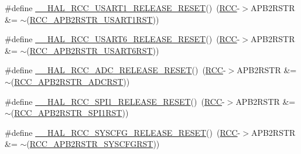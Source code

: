 \begin{DoxyCompactItemize}
\item 
\#define \hyperlink{group___r_c_c___a_p_b2___force___release___reset_ga243061674e38d05d222697046d43813a}{\+\_\+\+\_\+\+H\+A\+L\+\_\+\+R\+C\+C\+\_\+\+U\+S\+A\+R\+T1\+\_\+\+R\+E\+L\+E\+A\+S\+E\+\_\+\+R\+E\+S\+ET}()~(\hyperlink{group___peripheral__declaration_ga74944438a086975793d26ae48d5882d4}{R\+CC}-\/$>$A\+P\+B2\+R\+S\+TR \&= $\sim$(\hyperlink{group___peripheral___registers___bits___definition_gae7ae8e338b3b42ad037e9e5b6eeb2c41}{R\+C\+C\+\_\+\+A\+P\+B2\+R\+S\+T\+R\+\_\+\+U\+S\+A\+R\+T1\+R\+ST}))
\item 
\#define \hyperlink{group___r_c_c___a_p_b2___force___release___reset_ga6b60ae1fd712732bea57de27f79a20d3}{\+\_\+\+\_\+\+H\+A\+L\+\_\+\+R\+C\+C\+\_\+\+U\+S\+A\+R\+T6\+\_\+\+R\+E\+L\+E\+A\+S\+E\+\_\+\+R\+E\+S\+ET}()~(\hyperlink{group___peripheral__declaration_ga74944438a086975793d26ae48d5882d4}{R\+CC}-\/$>$A\+P\+B2\+R\+S\+TR \&= $\sim$(\hyperlink{group___peripheral___registers___bits___definition_gada1df682293e15ed44b081d626220178}{R\+C\+C\+\_\+\+A\+P\+B2\+R\+S\+T\+R\+\_\+\+U\+S\+A\+R\+T6\+R\+ST}))
\item 
\#define \hyperlink{group___r_c_c___a_p_b2___force___release___reset_ga06411259bd987c32186d5851815cbd59}{\+\_\+\+\_\+\+H\+A\+L\+\_\+\+R\+C\+C\+\_\+\+A\+D\+C\+\_\+\+R\+E\+L\+E\+A\+S\+E\+\_\+\+R\+E\+S\+ET}()~(\hyperlink{group___peripheral__declaration_ga74944438a086975793d26ae48d5882d4}{R\+CC}-\/$>$A\+P\+B2\+R\+S\+TR \&= $\sim$(\hyperlink{group___peripheral___registers___bits___definition_ga1374d6eae8e7d02d1ad457b65f374a67}{R\+C\+C\+\_\+\+A\+P\+B2\+R\+S\+T\+R\+\_\+\+A\+D\+C\+R\+ST}))
\item 
\#define \hyperlink{group___r_c_c___a_p_b2___force___release___reset_gad7b4bc8c8a9146529a175c45eecf25e5}{\+\_\+\+\_\+\+H\+A\+L\+\_\+\+R\+C\+C\+\_\+\+S\+P\+I1\+\_\+\+R\+E\+L\+E\+A\+S\+E\+\_\+\+R\+E\+S\+ET}()~(\hyperlink{group___peripheral__declaration_ga74944438a086975793d26ae48d5882d4}{R\+CC}-\/$>$A\+P\+B2\+R\+S\+TR \&= $\sim$(\hyperlink{group___peripheral___registers___bits___definition_ga345f05d3508a9fd5128208761feb29fb}{R\+C\+C\+\_\+\+A\+P\+B2\+R\+S\+T\+R\+\_\+\+S\+P\+I1\+R\+ST}))
\item 
\#define \hyperlink{group___r_c_c___a_p_b2___force___release___reset_ga56de80d50f5ab276ebdeee16a0e2a31b}{\+\_\+\+\_\+\+H\+A\+L\+\_\+\+R\+C\+C\+\_\+\+S\+Y\+S\+C\+F\+G\+\_\+\+R\+E\+L\+E\+A\+S\+E\+\_\+\+R\+E\+S\+ET}()~(\hyperlink{group___peripheral__declaration_ga74944438a086975793d26ae48d5882d4}{R\+CC}-\/$>$A\+P\+B2\+R\+S\+TR \&= $\sim$(\hyperlink{group___peripheral___registers___bits___definition_ga813d42b8d48ae6379c053a44870af49d}{R\+C\+C\+\_\+\+A\+P\+B2\+R\+S\+T\+R\+\_\+\+S\+Y\+S\+C\+F\+G\+R\+ST}))

\end{DoxyCompactItemize}
